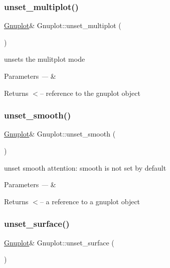 \subsubsection{\texorpdfstring{unset\+\_\+multiplot()}{unset\_multiplot()}}
{\footnotesize\ttfamily \hyperlink{class_gnuplot}{Gnuplot}\& Gnuplot\+::unset\+\_\+multiplot (\begin{DoxyParamCaption}{ }\end{DoxyParamCaption})\hspace{0.3cm}{\ttfamily [inline]}}

unsets the mulitplot mode


\begin{DoxyParams}{Parameters}
{\em ---} & \\
\hline
\end{DoxyParams}
\begin{DoxyReturn}{Returns}
$<$-- reference to the gnuplot object 
\end{DoxyReturn}
\mbox{\label{class_gnuplot_ad9dfbccd66dece1dbe5803605c6ab08c}} 
\subsubsection{\texorpdfstring{unset\+\_\+smooth()}{unset\_smooth()}}
{\footnotesize\ttfamily \hyperlink{class_gnuplot}{Gnuplot}\& Gnuplot\+::unset\+\_\+smooth (\begin{DoxyParamCaption}{ }\end{DoxyParamCaption})\hspace{0.3cm}{\ttfamily [inline]}}



unset smooth attention\+: smooth is not set by default 


\begin{DoxyParams}{Parameters}
{\em ---} & \\
\hline
\end{DoxyParams}
\begin{DoxyReturn}{Returns}
$<$-- a reference to a gnuplot object 
\end{DoxyReturn}
\mbox{\label{class_gnuplot_a4ebddacbec61aa3e7bc4b89f508ad621}} 
\subsubsection{\texorpdfstring{unset\+\_\+surface()}{unset\_surface()}}
{\footnotesize\ttfamily \hyperlink{class_gnuplot}{Gnuplot}\& Gnuplot\+::unset\+\_\+surface (\begin{DoxyParamCaption}{ }\end{DoxyParamCaption})\hspace{0.3cm}{\ttfamily [inline]}}

